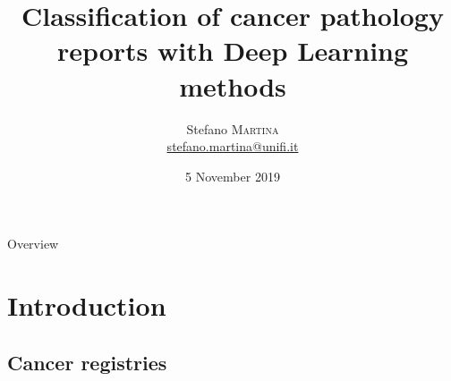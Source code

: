 






\title[]{\textbf{Classification of cancer pathology reports with Deep
  Learning methods}}
\date[5 November 2019]{5 November 2019}

\author[Stefano Martina]{
  \begin{center}
    \begin{tabular}{lr}
      Stefano \textsc{Martina}\\
      \href{mailto:stefano.martina@unifi.it}{stefano.martina@unifi.it}\\
    \end{tabular}
  \end{center}
}




\begin{frame}[plain]
  \titlepage
\end{frame}

\begin{frame}{Overview}
  \tableofcontents
\end{frame}

\section{Introduction}

\subsection{Cancer registries}

